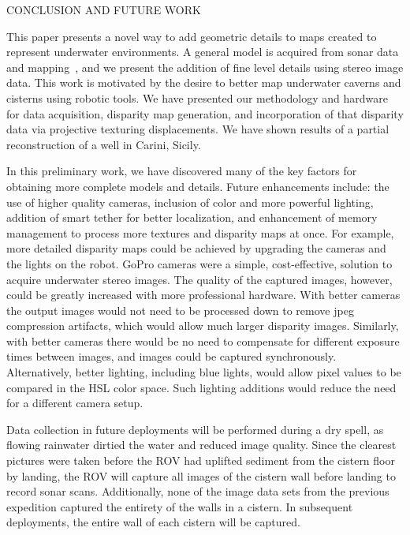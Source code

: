 \documentclass[twocolumn]{article}
\makeatletter
\def\section{\@startsection{section}{1}{\z@}{24pt plus 2 pt
minus 2 pt} {12pt plus 2pt minus 2pt}{\large\bf}}
\makeatother
\begin{document}

\section{\uppercase{Conclusion and Future Work}}
\label{sec:conclusion}

\noindent 
This paper presents a novel way to add geometric details to maps created to represent underwater environments. A general model is acquired from sonar data and mapping~\cite{ICEX11,McVicker,McVicker2}, and we present the addition of fine level details using stereo image data.  This work is motivated by the desire to better map underwater caverns and cisterns using robotic tools.  We have presented our methodology and hardware for data acquisition, disparity map generation, and incorporation of that disparity data via projective texturing displacements.  We have shown results of a partial reconstruction of a well in Carini, Sicily.

In this preliminary work, we have discovered many of the key factors for obtaining more complete models and details.  Future enhancements include: the use of higher quality cameras, inclusion of color and more powerful lighting, addition of smart tether for better localization, and enhancement of memory management to process more textures and disparity maps at once.
For example, more detailed disparity maps could be achieved by upgrading the cameras and the lights on the robot.
GoPro cameras were a simple, cost-effective, solution to acquire underwater stereo images.
The quality of the captured images, however, could be greatly increased with more professional hardware.
With better cameras the output images would not need to be processed down to remove jpeg compression artifacts, which would allow much larger disparity images.  
Similarly, with better cameras there would be no need to compensate for different exposure times between images, and images could be captured synchronously.
Alternatively, better lighting, including blue lights, would allow pixel values to be compared in the HSL color space.
Such lighting additions would reduce the need for a different camera setup.

Data collection in future deployments will be performed during a dry spell, as flowing rainwater dirtied the water and reduced image quality. Since the clearest pictures were taken before the ROV had uplifted sediment from the cistern floor by landing, the ROV will capture all images of the cistern wall before landing to record sonar scans. Additionally, none of the image data sets from the previous expedition captured the entirety of the walls in a cistern. In subsequent deployments, the entire wall of each cistern will be captured.
\end{document}
